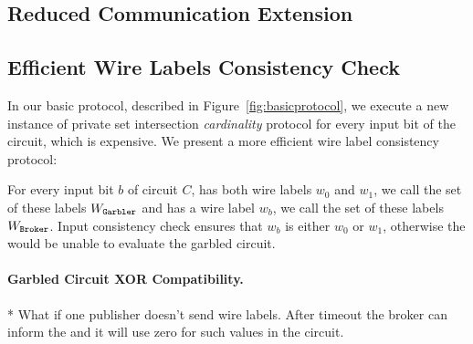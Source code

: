 \subsection{Reduced Communication Extension}


\subsection{Efficient Wire Labels Consistency Check} In our basic
protocol, described in Figure~\ref{fig:basicprotocol}, we execute a new
instance of private set intersection \emph{cardinality} protocol for every
input bit of the circuit, which is expensive.  We present a more efficient wire
label consistency protocol:

For every input bit $b$ of circuit $C$, \garbler has both wire labels $w_0$ and
$w_1$, we call the set of these labels $W_\texttt{Garbler}$ and \broker has a wire
label $w_b$, we call the set of these labels $W_\texttt{Broker}$. Input consistency
check ensures that $w_b$ is either $w_0$ or $w_1$, otherwise the \broker would
be unable to evaluate the garbled circuit.




\paragraph{Garbled Circuit XOR Compatibility.}


* What if one publisher doesn't send wire labels. After timeout the broker can
inform the \garbler and it will use zero for such values in the circuit.







